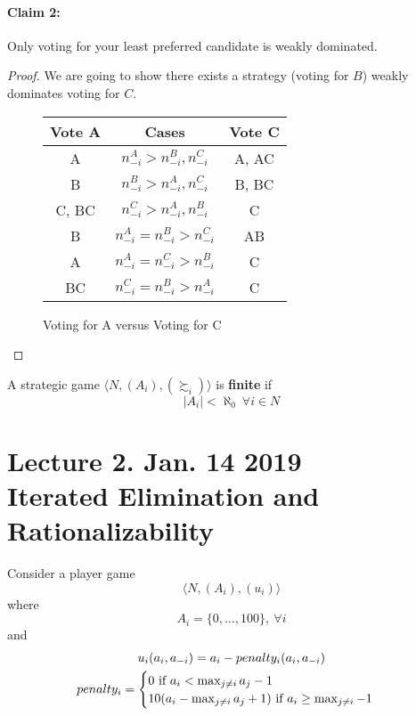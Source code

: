 \documentclass[11pt]{article}
\begin{document}
\begin{example}
			\paragraph{Claim 2:}Only voting for your least preferred candidate is weakly dominated.
			\begin{proof}
				We are going to show there exists a strategy (voting for $B$) weakly dominates voting for $C$.
				\begin{figure}[H]
					\centering
					\begin{tabular}{c|c|c}
						Vote A & Cases & Vote C \\
						\hline
						A & $n_{-i}^A > n_{-i}^B, n_{-i}^C$ & A, AC \\
						B & $n_{-i}^B > n_{-i}^A, n_{-i}^C$ & B, BC \\
						C, BC & $n_{-i}^C > n_{-i}^A, n_{-i}^B$ & C\\
						B & $n_{-i}^A = n_{-i}^B > n_{-i}^C$ & AB\\
						A & $n_{-i}^A = n_{-i}^C > n_{-i}^B$ & C\\
						BC & $n_{-i}^C = n_{-i}^B > n_{-i}^A$ & C
					\end{tabular}
					\caption{Voting for A versus Voting for C}
				\end{figure}
			\end{proof}
		\end{example}
		
		\begin{definition}[pg.11]
			A strategic game $\langle N, (A_i), (\succsim_i) \rangle$ is \textbf{finite} if 
			\[
				|A_i| < \aleph_0\ \forall i \in N
			\]
		\end{definition}
	
	\section{Lecture 2. Jan. 14 2019\\Iterated Elimination and Rationalizability}
		\begin{example}
			Consider a player game
			\begin{equation}
				\langle N, (A_i), (u_i) \rangle
			\end{equation}
			where 
			\begin{equation}
				A_i = \{0,\dots,100\},\ \forall i
			\end{equation}
			and 
			\begin{gather}
				u_i(a_i, a_{-i}) = a_i - penalty_i(a_i, a_{-i}) \\
				penalty_i = \begin{cases}
					0 \text{{ if }} a_i < \max_{j \neq i} a_j - 1 \\
					10(a_i - \max_{j \neq i} a_j + 1) \text{{ if }} a_i \geq \max_{j \neq i} - 1
				\end{cases}
			\end{gather}
		\end{example}	
		
\end{document}
